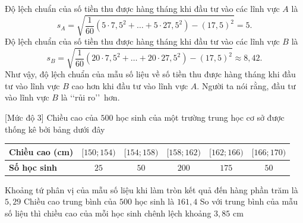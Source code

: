 \begin{ex}
{\begin{itemchoice}
			\itemch  Độ lệch chuẩn của số tiền thu được hàng tháng khi đầu tư vào các lĩnh vực $A$ là 
			$$s_A=\sqrt{\dfrac 1{60}\left(5\cdot 7{,}5^2+\ldots+5\cdot 27{,}5^2\right)-(17{,}5)^2}=5.$$	
			\itemch Độ lệch chuẩn của số tiền thu được hàng tháng khi đầu tư vào các lĩnh vực $B$ là 	$$s_B=\sqrt{\dfrac 1{60}\left(20\cdot 7{,}5^2+\ldots+20\cdot 27{,}5^2\right)-(17{,}5)^2}\approx 8{,}42.$$
			Như vậy, độ lệch chuẩn của mẫu số liệu về số tiền thu được hàng tháng khi đầu tư vào lĩnh vực $B$ cao hơn khi đầu tư vào lĩnh vực $A$. Người ta nói rằng, đầu tư vào lĩnh vực $B$ là \lq\lq rủi ro\rq\rq\, hơn.	
		\end{itemchoice}	
	}
\end{ex}

\begin{ex}%
[Mức độ 3]%
	Chiều cao của $500$ học sinh của một trường trung học cơ sở được thống kê bởi bảng dưới đây
	\begin{center}
		\begin{tabular}{|l|c|c|c|c|c|}
			\hline
			\textbf{Chiều cao (cm)} & $[150; 154)$ & $ [154; 158)$ & $ [158; 162)$ & $ [162; 166)$ & $ [166; 170)$   \\
			\hline
			\textbf{Số học sinh }&$25$ & $50$ & $200$ & $175$ & $50$ \\
			\hline
		\end{tabular}
	\end{center}
	{\True Khoảng tứ phân vị của mẫu số liệu khi làm tròn kết quả đến hàng phần trăm là $5{,}29$}
	{\True Chiều cao trung bình của $500$ học sinh là $161{,}4$}
	{\True So với trung bình của mẫu số liệu thì chiều cao của mỗi học sinh chênh lệch khoảng $3{,}85$ cm}
	\loigiai{
	Ta có cỡ mẫu $n = 25 + 50 + 200 + 175 + 50 = 500$.
	\begin{center}
		\begin{tabular}{|l|c|c|c|c|c|}
			\hline
			\textbf{Chiều cao (cm)} & $[150; 154)$ & $[154; 158)$ & $[158; 162)$ & $[162; 166)$ & $[166; 170)$   \\
			\hline
			\textbf{Số học sinh }&$25$ & $50$ & $200$ & $175$ & $50$ \\ \hline
			\textbf{Tần số tích lũy} & $25$ & $ 75 $ & $275$ & $450$ & $500$ \\
			\hline

\end{tabular}
\end{center}}
\end{ex}
